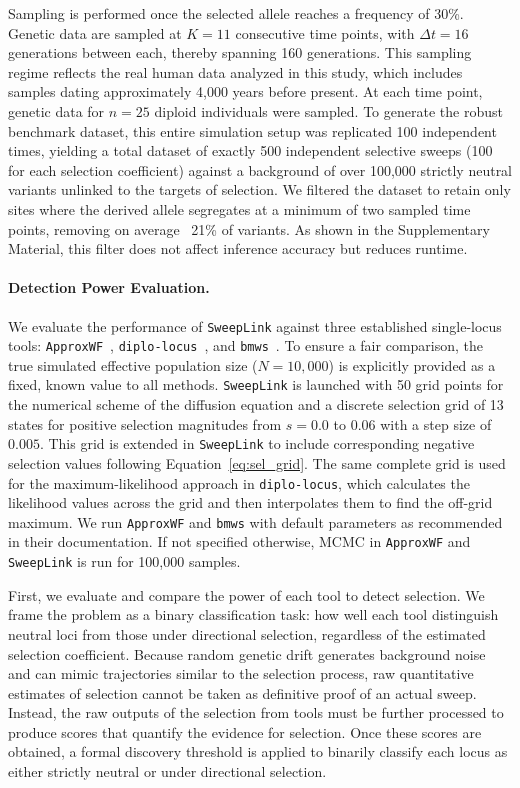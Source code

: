 \documentclass{article}
\newcommand{\SweepLink}{\texttt{SweepLink}\xspace}
\newcommand{\ApproxWF}{\texttt{ApproxWF}\xspace}
\newcommand{\diplolocus}{\texttt{diplo-locus}\xspace}
\newcommand{\bmws}{\texttt{bmws}\xspace}
\begin{document}
Sampling is performed once the selected allele reaches a frequency of 30\%.
Genetic data are sampled at $K=11$ consecutive time points, with $\Delta t=16$ generations between each, thereby spanning 160 generations.
This sampling regime reflects the real human data analyzed in this study, which includes samples dating approximately 4,000 years before present.
At each time point, genetic data for $n=25$ diploid individuals were sampled.
To generate the robust benchmark dataset, this entire simulation setup was replicated 100 independent times, yielding a total dataset of exactly 500 independent selective sweeps (100 for each selection coefficient) against a background of over 100,000 strictly neutral variants unlinked to the targets of selection.
We filtered the dataset to retain only sites where the derived allele segregates at a minimum of two sampled time points, removing on average ~21\% of variants.
As shown in the Supplementary Material, this filter does not affect inference accuracy but reduces runtime.

\paragraph{Detection Power Evaluation.}
We evaluate the performance of \SweepLink against three established single-locus tools: \ApproxWF~\citep{ferrer2016}, \diplolocus~\citep{cheng2025}, and \bmws~\citep{mathieson2022}.
To ensure a fair comparison, the true simulated effective population size ($ N=10{,}000 $) is explicitly provided as a fixed, known value to all methods.
\SweepLink is launched with 50 grid points for the numerical scheme of the diffusion equation and a discrete selection grid of 13 states for positive selection magnitudes from $s=0.0$ to $0.06$ with a step size of $0.005$.
This grid is extended in \SweepLink to include corresponding negative selection values following Equation~\ref{eq:sel_grid}.
The same complete grid is used for the maximum-likelihood approach in \diplolocus, which calculates the likelihood values across the grid and then interpolates them to find the off-grid maximum.
We run \ApproxWF and \bmws with default parameters as recommended in their documentation.
If not specified otherwise, MCMC in \ApproxWF and \SweepLink is run for 100,000 samples.

First, we evaluate and compare the power of each tool to detect selection.
We frame the problem as a binary classification task: how well each tool distinguish neutral loci from those under directional selection, regardless of the estimated selection coefficient.
Because random genetic drift generates background noise and can mimic trajectories similar to the selection process, raw quantitative estimates of selection cannot be taken as definitive proof of an actual sweep.
Instead, the raw outputs of the selection from tools must be further processed to produce scores that quantify the evidence for selection.
Once these scores are obtained, a formal discovery threshold is applied to binarily classify each locus as either strictly neutral or under directional selection.
\end{document}
